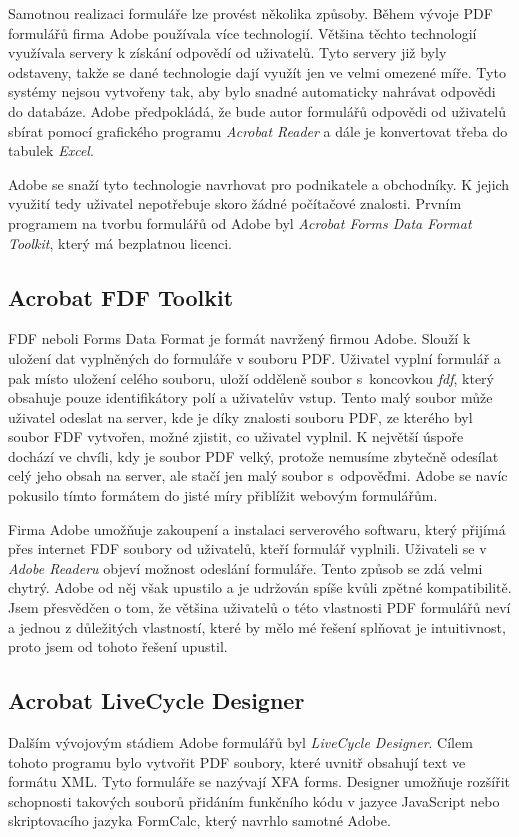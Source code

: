 \documentclass[czech,BP]{thesiskiv}
\begin{document}
Samotnou realizaci formuláře lze provést několika způsoby. Během vývoje PDF formulářů firma Adobe používala více technologií. Většina těchto technologií využívala servery k získání odpovědí od uživatelů. Tyto servery již byly odstaveny, takže se dané technologie dají využít jen ve velmi omezené míře. Tyto systémy nejsou vytvořeny tak, aby bylo snadné automaticky nahrávat odpovědi do databáze. Adobe předpokládá, že bude autor formulářů odpovědi od uživatelů sbírat pomocí grafického programu \emph{Acrobat Reader} a dále je konvertovat třeba do tabulek \emph{Excel}. 

Adobe se snaží tyto technologie navrhovat pro podnikatele a obchodníky. K jejich využití tedy uživatel nepotřebuje skoro žádné počítačové znalosti. Prvním programem na tvorbu formulářů od Adobe byl \emph{Acrobat Forms Data Format Toolkit}, který má bezplatnou licenci.
\subsection{Acrobat FDF Toolkit}
FDF neboli Forms Data Format je formát navržený firmou Adobe. Slouží k uložení dat vyplněných do formuláře v souboru PDF. Uživatel vyplní formulář a pak místo uložení celého souboru, uloží odděleně soubor s~koncovkou \emph{fdf}, který obsahuje pouze identifikátory polí a uživatelův vstup. Tento malý soubor může uživatel odeslat na server, kde je díky znalosti souboru PDF, ze kterého byl soubor FDF vytvořen, možné zjistit, co uživatel vyplnil. K největší úspoře dochází ve chvíli, kdy je soubor PDF velký, protože nemusíme zbytečně odesílat celý jeho obsah na server, ale stačí jen malý soubor s~odpověďmi. Adobe se navíc pokusilo tímto formátem do jisté míry přiblížit webovým formulářům. 

Firma Adobe umožňuje zakoupení a instalaci serverového softwaru, který přijímá přes internet FDF soubory od uživatelů, kteří formulář vyplnili. Uživateli se v \emph{Adobe Readeru} objeví možnost odeslání formuláře. Tento způsob se zdá velmi chytrý. Adobe od něj však upustilo a je udržován spíše kvůli zpětné kompatibilitě. Jsem přesvědčen o tom, že většina uživatelů o této vlastnosti PDF formulářů neví a jednou z důležitých vlastností, které by mělo mé řešení splňovat je intuitivnost, proto jsem od tohoto řešení upustil.

\subsection{Acrobat LiveCycle Designer}
Dalším vývojovým stádiem Adobe formulářů byl \emph{LiveCycle Designer}. Cílem tohoto programu bylo vytvořit PDF soubory, které uvnitř obsahují text ve formátu XML. Tyto formuláře se nazývají XFA forms. Designer umožňuje rozšířit schopnosti takových souborů přidáním funkčního kódu v jazyce JavaScript nebo skriptovacího jazyka FormCalc, který navrhlo samotné Adobe.
\end{document}
